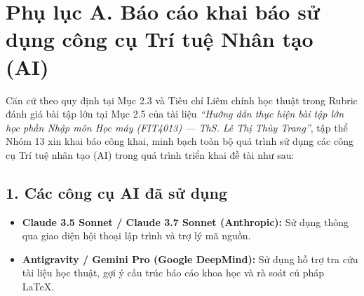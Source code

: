 \appendix
{}

\section*{Phụ lục A. Báo cáo khai báo sử dụng công cụ Trí tuệ Nhân tạo (AI)}

Căn cứ theo quy định tại Mục 2.3 và Tiêu chí Liêm chính học thuật trong Rubric đánh giá bài tập lớn tại Mục 2.5 của tài liệu \textit{“Hướng dẫn thực hiện bài tập lớn học phần Nhập môn Học máy (FIT4013) --- ThS. Lê Thị Thùy Trang”}, tập thể Nhóm 13 xin khai báo công khai, minh bạch toàn bộ quá trình sử dụng các công cụ Trí tuệ nhân tạo (AI) trong quá trình triển khai đề tài như sau:

\subsection*{1. Các công cụ AI đã sử dụng}
\begin{itemize}
    \item \textbf{Claude 3.5 Sonnet / Claude 3.7 Sonnet (Anthropic):} Sử dụng thông qua giao diện hội thoại lập trình và trợ lý mã nguồn.
    \item \textbf{Antigravity / Gemini Pro (Google DeepMind):} Sử dụng hỗ trợ tra cứu tài liệu học thuật, gợi ý cấu trúc báo cáo khoa học và rà soát cú pháp \LaTeX.
\end{itemize}

